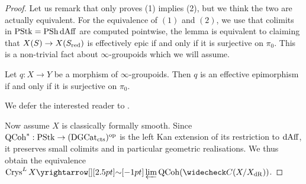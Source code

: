 \documentclass[./main.tex]{subfiles}
\begin{document}
\begin{proof}
  
  Let us remark that \cite[Lem 1.2.4]{Crys} only proves (1) implies (2),
  but we think the two are actually equivalent.
  For the equivalence of $(1)$ and $(2)$,
  we use that colimits in $\mathrm{PStk} = \mathrm{PSh}\,\mathrm{dAff}$ are computed pointwise,
  the lemma is equivalent to claiming that
  $X(S) \to X(S_{\mathrm{red}})$ is effectively epic if and only if
  it is surjective on $\pi_0$.
  This is a non-trivial fact about $\infty$-groupoids which we will assume.
  \begin{lem}
    
    Let $q : X \to Y$ be a morphism of $\infty$-groupoids.
    Then $q$ is an effective epimorphism if and only if 
    it is surjective on $\pi_0$.
    \begin{proof1}
      We defer the interested reader to
      \cite[Prop 7.2.1.15]{Lurie-HTT}.

    \end{proof1}
  \end{lem}

  Now assume $X$ is classically formally smooth.
  Since $\mathrm{QCoh}^* : \mathrm{PStk} \to (\mathrm{DGCat}_{\mathrm{cts}})^{\mathrm{op}}$ is the left Kan extension of
  its restriction to $\mathrm{dAff}$, it preserves small colimits
  and in particular geometric realisations.
  We thus obtain the equivalence 
  $\CRYS^L\,X \map{\sim}{} \LIM \QCOH(\check{C}(X / X_\DR))$.


\end{proof}
\end{document}
